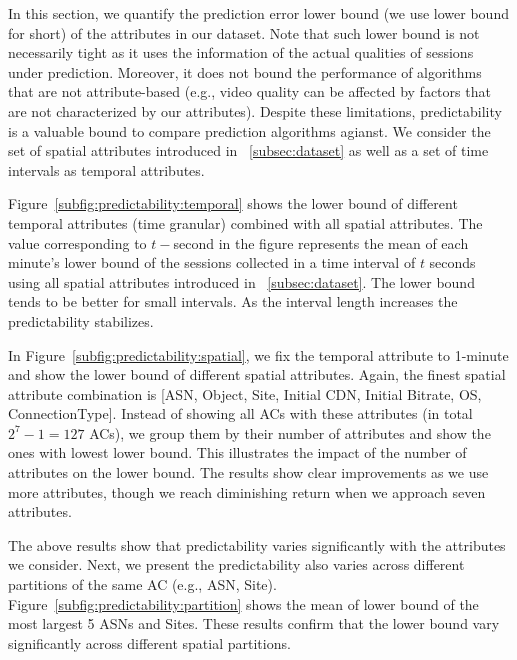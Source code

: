 

In this section, we quantify the prediction error lower bound (we use lower bound for short) of the attributes in our dataset. Note that such lower bound is not necessarily tight as it uses the information of the actual qualities of sessions under prediction. Moreover, it does not bound the performance of algorithms that are not attribute-based (e.g., video quality can be affected by factors that are not characterized by our attributes).
Despite these limitations, predictability is a valuable bound to compare prediction algorithms agianst. We consider the set of spatial attributes introduced in \Section~\ref{subsec:dataset} as well as a set of time intervals as temporal attributes.

 Figure~\ref{subfig:predictability:temporal} shows the lower bound of different temporal attributes (time granular) combined with all spatial attributes. The value corresponding to $t-$second in the figure represents the mean of each minute's lower bound of the sessions collected in a time interval of $t$ seconds using all spatial attributes introduced in \Section~\ref{subsec:dataset}. The lower bound tends to be better for small intervals. As the interval length increases the predictability stabilizes.

 In Figure~\ref{subfig:predictability:spatial}, we fix the temporal attribute to 1-minute and show the lower bound of different spatial attributes. Again, the finest spatial attribute combination is [ASN, Object, Site, Initial CDN, Initial Bitrate, OS, ConnectionType].  Instead of showing all ACs with these attributes (in total $2^7-1=127$ ACs), we group them by their number of attributes and show the ones with lowest lower bound. This illustrates the impact of the number of attributes on the lower bound. The results show clear improvements as we use more attributes, though we reach diminishing return when we approach seven attributes.

 The above results show that predictability varies significantly with the attributes we consider. Next, we present the predictability also varies across different partitions of the same AC (e.g., ASN, Site). Figure~\ref{subfig:predictability:partition} shows the mean of lower bound of the most largest 5 ASNs and Sites. These results confirm that the lower bound vary significantly across different spatial partitions. 



